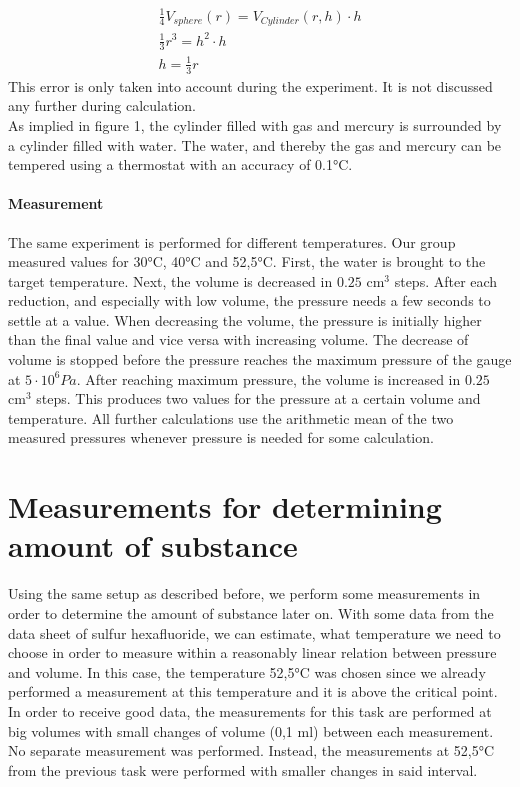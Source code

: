 \documentclass[10pt,a4paper]{article}
\begin{document}
\begin{align}
\frac{1}{4}V_{sphere}(r) = V_{Cylinder}(r,h) \cdot h\\
\frac{1}{3} r^3 = h^2 \cdot h\\
h = \frac{1}{3}r
\end{align}
This error is only taken into account during the experiment. It is not discussed any further during calculation.\\
As implied in figure 1, the cylinder filled with gas and mercury is surrounded by a cylinder filled with water. The water, and thereby the gas and mercury can be tempered using a thermostat with an accuracy of 0.1°C.

\paragraph{Measurement}

The same experiment is performed for different temperatures. Our group measured values for 30°C, 40°C and 52,5°C.
First, the water is brought to the target temperature. Next, the volume is decreased in $0.25$ cm$^3$ steps. After each reduction, and especially with low volume, the pressure needs a few seconds to settle at a value. When decreasing the volume, the pressure is initially higher than the final value and vice versa with increasing volume. The decrease of volume is stopped before the pressure reaches the maximum pressure of the gauge at $5\cdot10^6 Pa$. After reaching maximum pressure, the volume is increased in $0.25$ cm$^3$ steps. This produces two values for the pressure at a certain volume and temperature. All further calculations use the arithmetic mean of the two measured pressures whenever pressure is needed for some calculation.


\section{Measurements for determining amount of substance}

Using the same setup as described before, we perform some measurements in order to determine the amount of substance later on. With some data from the data sheet \cite{messerDataSheet} of sulfur hexafluoride, we can estimate, what temperature we need to choose in order to measure within a reasonably linear relation between pressure and volume. In this case, the temperature 52,5°C was chosen since we already performed a measurement at this temperature and it is above the critical point. In order to receive good data, the measurements for this task are performed at big volumes with small changes of volume (0,1 ml) between each measurement.\\
No separate measurement was performed. Instead, the measurements at 52,5°C from the previous task were performed with smaller changes in said interval.
\end{document}
